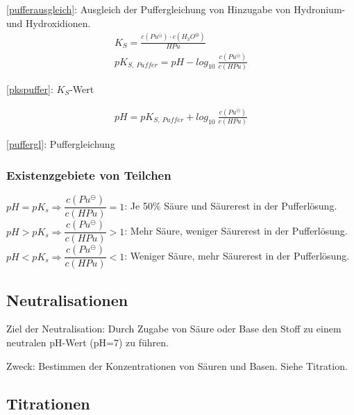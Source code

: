 \ref{pufferausgleich}: Ausgleich der Puffergleichung von Hinzugabe von Hydronium- und Hydroxidionen.\\

{\large
	\begin{equation}
	\begin{split}
		\label{pkspuffer}
		K_S = \frac{c(Pu^\ominus) \cdot c(H_3O^\oplus)}{HPu}\\
		pK_{S,\ Puffer} = pH - log_{10}\ \frac{c(Pu^\ominus)}{c(HPu)}
	\end{split}
	\end{equation}
}

\ref{pkspuffer}: $K_S$-Wert

{\large
	\begin{equation}
	\begin{split}
	\label{puffergl}
	pH= pK_{S,\ Puffer} + log_{10}\ \frac{c(Pu^\ominus)}{c(HPu)}
	\end{split}
	\end{equation}
}

\ref{puffergl}: Puffergleichung

\subsubsection{Existenzgebiete von Teilchen}

$pH = pK_s \Rightarrow \dfrac{c(Pu^\ominus)}{c(HPu)} = 1$: Je 50\% Säure und Säurerest in der Pufferlösung.\\

$pH > pK_s \Rightarrow \dfrac{c(Pu^\ominus)}{c(HPu)} > 1$: Mehr Säure, weniger Säurerest in der Pufferlösung.\\

$pH < pK_s \Rightarrow \dfrac{c(Pu^\ominus)}{c(HPu)} < 1$: Weniger Säure, mehr Säurerest in der Pufferlösung.

\subsection{Neutralisationen}

Ziel der Neutralisation: Durch Zugabe von Säure oder Base den Stoff zu einem neutralen pH-Wert (pH=7) zu führen.

Zweck: Bestimmen der Konzentrationen von Säuren und Basen. Siehe Titration.

\subsection{Titrationen}

